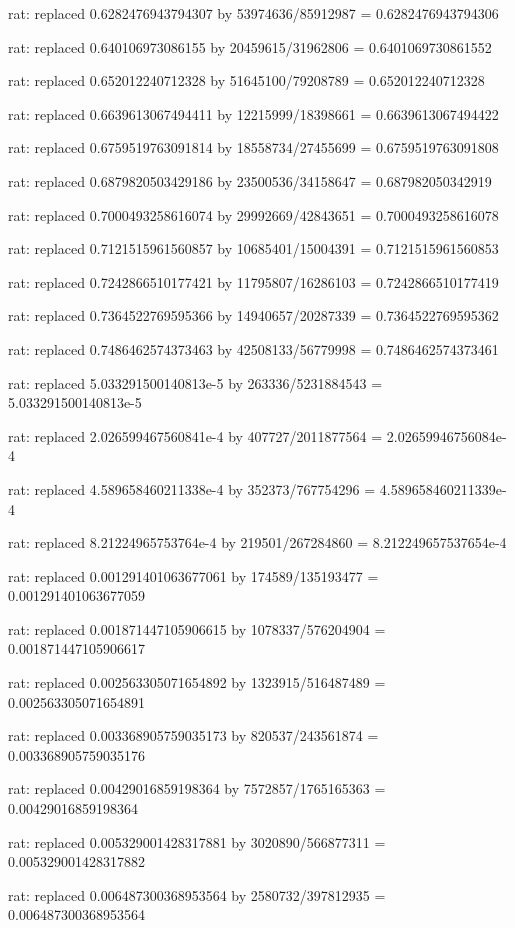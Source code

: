 \documentclass[a4paper,10pt]{article}
\begin{document}
\begin{eulernotebook}
\begin{eulercomment}
\begin{eulercomment}
\begin{eulercomment}
\begin{eulercomment}
\begin{eulercomment}
\begin{eulercomment}
\begin{eulercomment}
\begin{eulercomment}
\begin{eulercomment}
\begin{eulercomment}
\begin{eulercomment}
\begin{eulercomment}
\begin{eulercomment}
\begin{eulercomment}
\begin{eulercomment}
\begin{eulercomment}
\begin{euleroutput}
  rat: replaced 0.6282476943794307 by 53974636/85912987 = 0.6282476943794306
  
  rat: replaced 0.640106973086155 by 20459615/31962806 = 0.6401069730861552
  
  rat: replaced 0.652012240712328 by 51645100/79208789 = 0.652012240712328
  
  rat: replaced 0.6639613067494411 by 12215999/18398661 = 0.6639613067494422
  
  rat: replaced 0.6759519763091814 by 18558734/27455699 = 0.6759519763091808
  
  rat: replaced 0.6879820503429186 by 23500536/34158647 = 0.687982050342919
  
  rat: replaced 0.7000493258616074 by 29992669/42843651 = 0.7000493258616078
  
  rat: replaced 0.7121515961560857 by 10685401/15004391 = 0.7121515961560853
  
  rat: replaced 0.7242866510177421 by 11795807/16286103 = 0.7242866510177419
  
  rat: replaced 0.7364522769595366 by 14940657/20287339 = 0.7364522769595362
  
  rat: replaced 0.7486462574373463 by 42508133/56779998 = 0.7486462574373461
  
  rat: replaced 5.033291500140813e-5 by 263336/5231884543 = 5.033291500140813e-5
  
  rat: replaced 2.026599467560841e-4 by 407727/2011877564 = 2.02659946756084e-4
  
  rat: replaced 4.589658460211338e-4 by 352373/767754296 = 4.589658460211339e-4
  
  rat: replaced 8.21224965753764e-4 by 219501/267284860 = 8.212249657537654e-4
  
  rat: replaced 0.001291401063677061 by 174589/135193477 = 0.001291401063677059
  
  rat: replaced 0.001871447105906615 by 1078337/576204904 = 0.001871447105906617
  
  rat: replaced 0.002563305071654892 by 1323915/516487489 = 0.002563305071654891
  
  rat: replaced 0.003368905759035173 by 820537/243561874 = 0.003368905759035176
  
  rat: replaced 0.00429016859198364 by 7572857/1765165363 = 0.00429016859198364
  
  rat: replaced 0.005329001428317881 by 3020890/566877311 = 0.005329001428317882
  
  rat: replaced 0.006487300368953564 by 2580732/397812935 = 0.006487300368953564
  

\end{euleroutput}
\end{eulercomment}
\end{eulercomment}
\end{eulercomment}
\end{eulercomment}
\end{eulercomment}
\end{eulercomment}
\end{eulercomment}
\end{eulercomment}
\end{eulercomment}
\end{eulercomment}
\end{eulercomment}
\end{eulercomment}
\end{eulercomment}
\end{eulercomment}
\end{eulercomment}
\end{eulercomment}
\end{eulernotebook}
\end{document}
